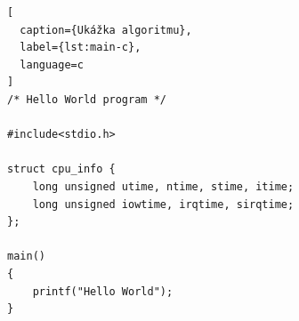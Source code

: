 \begin{lstlisting}[
  caption={Ukážka algoritmu},
  label={lst:main-c},
  language=c
]
/* Hello World program */

#include<stdio.h>

struct cpu_info {
    long unsigned utime, ntime, stime, itime;
    long unsigned iowtime, irqtime, sirqtime;
};

main()
{
    printf("Hello World");
}
\end{lstlisting}
